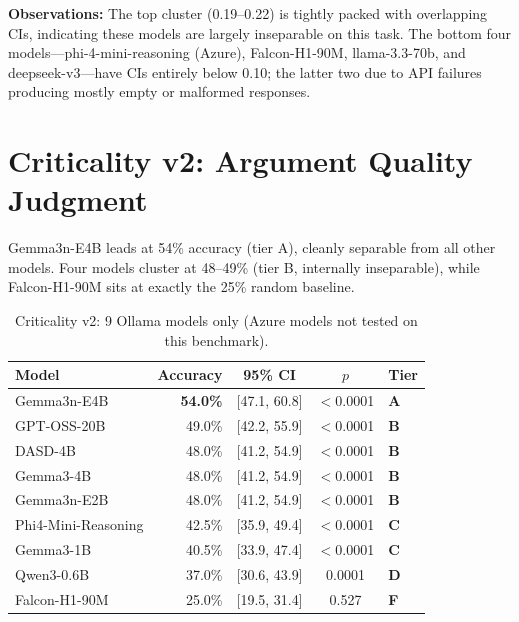 \documentclass[11pt,a4paper]{article}
\begin{document}
\textbf{Observations:} The top cluster (0.19--0.22) is tightly packed with overlapping CIs, indicating these models are largely inseparable on this task. The bottom four models---phi-4-mini-reasoning (Azure), Falcon-H1-90M, llama-3.3-70b, and deepseek-v3---have CIs entirely below 0.10; the latter two due to API failures producing mostly empty or malformed responses.

\section{Criticality v2: Argument Quality Judgment}

Gemma3n-E4B leads at 54\% accuracy (tier A), cleanly separable from all other models. Four models cluster at 48--49\% (tier B, internally inseparable), while Falcon-H1-90M sits at exactly the 25\% random baseline.

\begin{table}[h]
\centering
\caption{Criticality v2: 9 Ollama models only (Azure models not tested on this benchmark).}
\vspace{4pt}
\begin{tabular}{@{}lrccl@{}}
\toprule
\textbf{Model} & \textbf{Accuracy} & \textbf{95\% CI} & \textbf{$p$} & \textbf{Tier} \\
\midrule
Gemma3n-E4B          & \textbf{54.0\%} & [47.1, 60.8] & $<$0.0001 & \textcolor{tierA}{\textbf{A}} \\
GPT-OSS-20B          & 49.0\%          & [42.2, 55.9] & $<$0.0001 & \textcolor{tierB}{\textbf{B}} \\
DASD-4B              & 48.0\%          & [41.2, 54.9] & $<$0.0001 & \textcolor{tierB}{\textbf{B}} \\
Gemma3-4B            & 48.0\%          & [41.2, 54.9] & $<$0.0001 & \textcolor{tierB}{\textbf{B}} \\
Gemma3n-E2B          & 48.0\%          & [41.2, 54.9] & $<$0.0001 & \textcolor{tierB}{\textbf{B}} \\
Phi4-Mini-Reasoning  & 42.5\%          & [35.9, 49.4] & $<$0.0001 & \textcolor{tierC}{\textbf{C}} \\
Gemma3-1B            & 40.5\%          & [33.9, 47.4] & $<$0.0001 & \textcolor{tierC}{\textbf{C}} \\
Qwen3-0.6B           & 37.0\%          & [30.6, 43.9] & 0.0001    & \textcolor{tierD}{\textbf{D}} \\
Falcon-H1-90M        & 25.0\%          & [19.5, 31.4] & 0.527     & \textcolor{tierF}{\textbf{F}} \\
\bottomrule
\end{tabular}
\label{tab:criticality}
\end{table}
\end{document}
